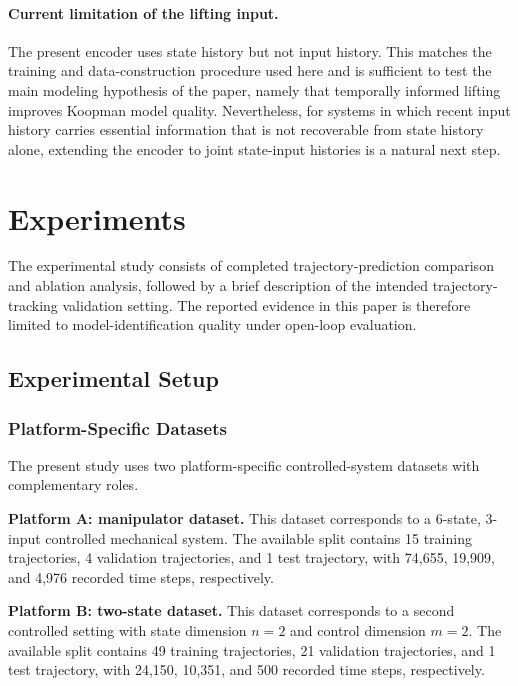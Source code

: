 \documentclass[journal]{IEEEtran}
\begin{document}
\paragraph{Current limitation of the lifting input.}
The present encoder uses state history but not input history. This matches the training and data-construction procedure used here and is sufficient to test the main modeling hypothesis of the paper, namely that temporally informed lifting improves Koopman model quality. Nevertheless, for systems in which recent input history carries essential information that is not recoverable from state history alone, extending the encoder to joint state-input histories is a natural next step.

\section{Experiments}
\label{sec:experiments}

The experimental study consists of completed trajectory-prediction comparison and ablation analysis, followed by a brief description of the intended trajectory-tracking validation setting. The reported evidence in this paper is therefore limited to model-identification quality under open-loop evaluation.

\subsection{Experimental Setup}

\subsubsection{Platform-Specific Datasets}

The present study uses two platform-specific controlled-system datasets with complementary roles.

\textbf{Platform A: manipulator dataset.} This dataset corresponds to a 6-state, 3-input controlled mechanical system. The available split contains 15 training trajectories, 4 validation trajectories, and 1 test trajectory, with 74,655, 19,909, and 4,976 recorded time steps, respectively.

\textbf{Platform B: two-state dataset.} This dataset corresponds to a second controlled setting with state dimension $n=2$ and control dimension $m=2$. The available split contains 49 training trajectories, 21 validation trajectories, and 1 test trajectory, with 24,150, 10,351, and 500 recorded time steps, respectively.
\end{document}
